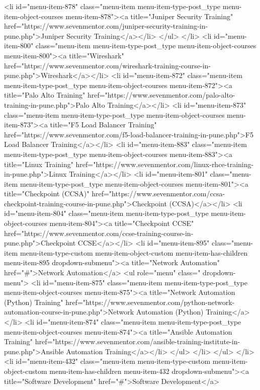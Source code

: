{<li id="menu-item-878" class="menu-item menu-item-type-post_type menu-item-object-courses menu-item-878"><a title="Juniper Security Training" href="https://www.sevenmentor.com/juniper-security-training-in-pune.php">Juniper Security Training</a></li>
</ul>
</li>
<li id="menu-item-800" class="menu-item menu-item-type-post_type menu-item-object-courses menu-item-800"><a title="Wireshark" href="https://www.sevenmentor.com/wireshark-training-course-in-pune.php">Wireshark</a></li>
<li id="menu-item-872" class="menu-item menu-item-type-post_type menu-item-object-courses menu-item-872"><a title="Palo Alto Training" href="https://www.sevenmentor.com/palo-alto-training-in-pune.php">Palo Alto Training</a></li>
<li id="menu-item-873" class="menu-item menu-item-type-post_type menu-item-object-courses menu-item-873"><a title="F5 Load Balancer Training" href="https://www.sevenmentor.com/f5-load-balancer-training-in-pune.php">F5 Load Balancer Training</a></li>
<li id="menu-item-883" class="menu-item menu-item-type-post_type menu-item-object-courses menu-item-883"><a title="Linux Training" href="https://www.sevenmentor.com/linux-rhce-training-in-pune.php">Linux Training</a></li>
<li id="menu-item-801" class="menu-item menu-item-type-post_type menu-item-object-courses menu-item-801"><a title="Checkpoint (CCSA)" href="https://www.sevenmentor.com/ccsa-checkpoint-training-course-in-pune.php">Checkpoint (CCSA)</a></li>
<li id="menu-item-804" class="menu-item menu-item-type-post_type menu-item-object-courses menu-item-804"><a title="Checkpoint CCSE" href="https://www.sevenmentor.com/ccse-training-course-in-pune.php">Checkpoint CCSE</a></li>
<li id="menu-item-895" class="menu-item menu-item-type-custom menu-item-object-custom menu-item-has-children menu-item-895 dropdown-submenu"><a title="Network Automation" href="#">Network Automation</a>
<ul role="menu" class=" dropdown-menu">
<li id="menu-item-875" class="menu-item menu-item-type-post_type menu-item-object-courses menu-item-875"><a title="Network Automation (Python) Training" href="https://www.sevenmentor.com/python-network-automation-course-in-pune.php">Network Automation (Python) Training</a></li>
<li id="menu-item-874" class="menu-item menu-item-type-post_type menu-item-object-courses menu-item-874"><a title="Ansible Automation Training" href="https://www.sevenmentor.com/ansible-training-institute-in-pune.php">Ansible Automation Training</a></li>
</ul>
</li>
</ul>
</li>
<li id="menu-item-432" class="menu-item menu-item-type-custom menu-item-object-custom menu-item-has-children menu-item-432 dropdown-submenu"><a title="Software Development" href="#">Software Development</a>
}
